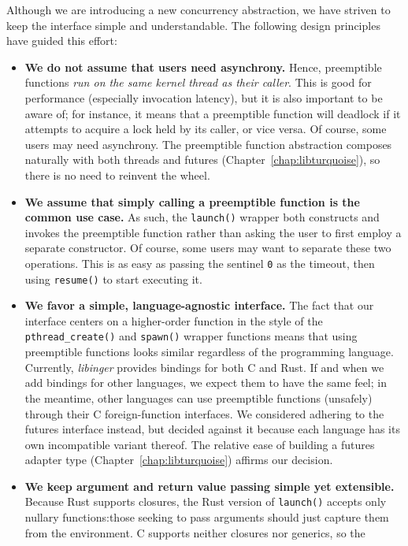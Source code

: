 Although we are introducing a new concurrency abstraction, we have striven to keep
the interface simple and understandable.  The following design principles have guided
this effort:
\begin{itemize}
\item \textbf{We do not assume that users need asynchrony.}  Hence, preemptible
	functions \textit{run on the same kernel thread as their caller}.  This is
	good for performance (especially invocation latency), but it is also
	important to be aware of; for instance, it means that a preemptible function
	will deadlock if it attempts to acquire a lock held by its caller, or vice
	versa.  Of course, some users may need asynchrony.  The preemptible function
	abstraction composes naturally with both threads and futures
	(Chapter~\ref{chap:libturquoise}), so there is no need to reinvent the wheel.
\item \textbf{We assume that simply calling a preemptible function is the common use
	case.}  As such, the \texttt{launch()} wrapper both constructs and invokes
	the preemptible function rather than asking the user to first employ a
	separate constructor.  Of course, some users may want to separate these two
	operations.  This is as easy as passing the sentinel \texttt{0} as the
	timeout, then using \texttt{resume()} to start executing it.
\item \textbf{We favor a simple, language-agnostic interface.}  The fact that our
	interface centers on a higher-order function in the style of the
	\texttt{pthread\_create()} and \texttt{spawn()} wrapper functions means that
	using preemptible functions looks similar regardless of the programming
	language.  Currently, \textit{libinger} provides bindings for both C and
	Rust.  If and when we add bindings for other languages, we expect them to
	have the same feel; in the meantime, other languages can use preemptible
	functions (unsafely) through their C
	foreign-function interfaces.  We considered adhering to the futures interface
	instead, but decided against it because each language has its own
	incompatible variant thereof.  The relative ease of building a futures
	adapter type (Chapter~\ref{chap:libturquoise}) affirms our decision.
\item \textbf{We keep argument and return value passing simple yet extensible.}
	Because Rust supports closures, the Rust version of \texttt{launch()} accepts
	only nullary functions:\@ those seeking to pass arguments should just capture
	them from the environment.  C supports neither closures nor generics, so the

\end{itemize}

